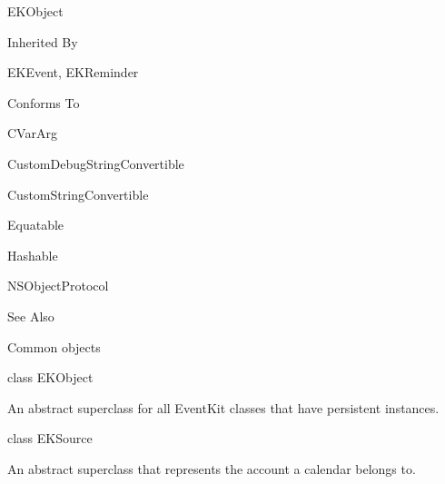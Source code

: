 \documentclass{article}
\begin{document}
EKObject

Inherited By

EKEvent, EKReminder

Conforms To

CVarArg

CustomDebugStringConvertible

CustomStringConvertible

Equatable

Hashable

NSObjectProtocol

See Also

Common objects

class EKObject

An abstract superclass for all EventKit classes that have persistent instances.

class EKSource

An abstract superclass that represents the account a calendar belongs to.

\newpage
\end{document}
